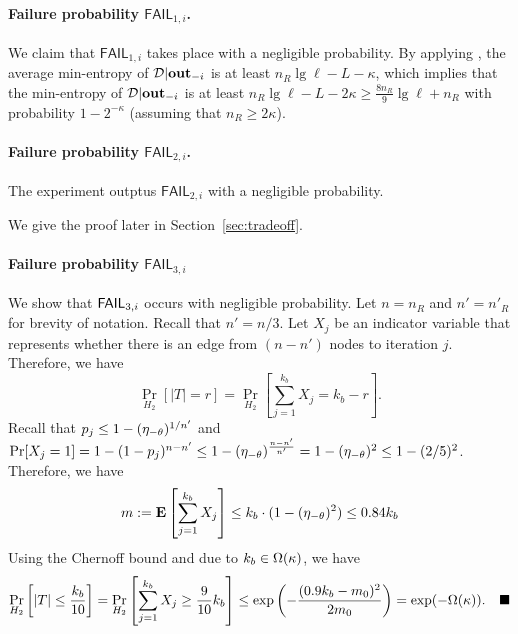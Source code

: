\paragraph{Failure probability $\mathsf{FAIL}_{1,i}$.}
We claim that $\mathsf{FAIL}_{1,i}$ takes place  with a negligible
probability. By applying \cite[Lemma 2.2]{DORS08}, the average min-entropy of
$\DDD|\vec{out}_{-i}$ is at least $n_R\lg \ell - L - \kappa$, which implies that
the min-entropy of $\DDD | \vec{out}_{-i}$ is at least $n_R\lg \ell - L -
2\kappa \ge  \frac{8n_R}{9} \lg \ell + n_R$ with probability $1 - 2^{-\kappa}$
(assuming that $n_R \ge 2\kappa$).
    
\paragraph{Failure probability $\mathsf{FAIL}_{2,i}$.} 
\begin{lemma} \label{lem:fail2}
The experiment outptus $\mathsf{FAIL}_{2,i}$ with a negligible probability. 
\end{lemma}
We give the proof later in Section~\ref{sec:tradeoff}.

\paragraph{Failure probability $\mathsf{FAIL}_{3,i}$}
We show that  $\FAIL{3,i}$ occurs with negligible probability.
Let $n = n_R$ and $n' = n'_R$ for brevity of notation. Recall that $n' = n/3$. 
%
Let $X_j$ be an indicator variable that
represents whether there is an edge from $(n-n')$ nodes to iteration
$j$. Therefore, 
we have 
\[ \Pr_{H_2}[|T| = r] = \Pr_{H_2} \left[ \sum_{j=1}^{k_b} X_j = k_b - r \right]. \]
%
Recall that $p_j \le 1-(\etan)^{1/n'}$ and 
$\Pr[X_j = 1] = 1 - (1 - p_j)^{n-n'} \le 1 - (\etan)^\frac{n-n'}{n'} = 1 - (\etan)^2 \le 1 - (2/5)^2$.
%
Therefore, we have 
\[m:= {\bf E}\left[ \sum_{j=1}^{k_b} X_j \right] \le k_b \cdot (1
- (\etan)^2) \le 0.84 k_b\]
%
Using the Chernoff bound and due to $k_b \in \Omega(\secparam)$, 
we have 
\[ \Pr_{H_2}\left [|T| \le \frac{k_b}{10} \right] = \Pr_{H_2} \left[ \sum_{j=1}^{k_b} X_j \ge \frac{9}{10}k_b \right] \le \exp\left(-\frac{(0.9 k_b - m_0)^2}{2 m_0}\right) = 
\exp(-\Omega(\kappa)).  \qedhere\] 

